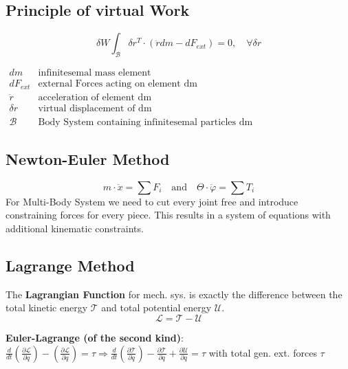 \documentclass[fontsize=6pt,DIV=calc,a4paper,ngerman]{scrartcl}
\begin{document}
\begin{multicols*}{4}
	\subsection{Principle of virtual Work}
	$$\delta W \int_\mathcal{B} \delta r^T \cdot (\ddot{r}dm-dF_{ext})=0, \quad \forall \delta r$$
	\begin{center}
		$\begin{array}{r|l}
				dm          & \text{infinitesemal mass element}                        \\
				dF_{ext}    & \text{external Forces acting on element dm}              \\
				\ddot{r}    & \text{acceleration of element dm}                        \\
				\delta r    & \text{virtual displacement of dm}                        \\
				\mathcal{B} & \text{Body System containing infinitesemal particles dm}
			\end{array}$

	\end{center}

	\subsection{Newton-Euler Method}

	$$m\cdot \ddot{x} = \sum F_i \quad \text{and} \quad \Theta \cdot \ddot{\varphi} = \sum T_i$$
	For Multi-Body System we need to cut every joint free and introduce constraining forces for every piece. This results in a system of equations with additional kinematic constraints.

	\subsection{Lagrange Method}

	The \textbf{Lagrangian Function} for mech. sys. is exactly the difference between the total kinetic energy $\mathcal{T}$ and total potential energy $\mathcal{U}$.
	$$\mathcal{L} = \mathcal{T}-\mathcal{U}$$

	\textbf{Euler-Lagrange (of the second kind)}:
	$
		\frac{d}{dt}\left(\frac{\partial \mathcal{L}}{\partial \dot{q}}\right) - \left(\frac{\partial \mathcal{L}}{\partial q}\right) = \tau
		\Rightarrow
		\frac{d}{dt} \left(\frac{\partial \mathcal{T}}{\partial \dot{q}} \right) - \frac{\partial \mathcal{T}}{\partial q} + \frac{\partial \mathcal{U}}{\partial q} = \tau
	$
	with total gen. ext. forces $\tau$


\end{multicols*}
\end{document}
